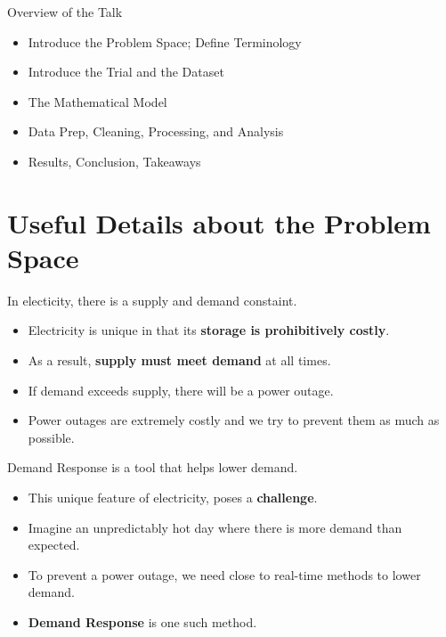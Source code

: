 \documentclass{beamer}
\begin{document}
\begin{frame}{Overview of the Talk}
  \begin{itemize}
  \item<+-> Introduce the Problem Space; Define Terminology
  \item<+-> Introduce the Trial and the Dataset
  \item<+-> The Mathematical Model
  \item<+-> Data Prep, Cleaning, Processing, and Analysis
  \item<+-> Results, Conclusion, Takeaways
  \end{itemize}
\end{frame}

\section{Useful Details about the Problem Space}

\begin{frame}{In electicity, there is a supply and demand constaint.}
  \begin{itemize}
    \item<+-> Electricity is unique in that its \textbf{storage is prohibitively costly}.
    \item<+-> As a result, \textbf{supply must meet demand} at all times. 
    \item<+-> If demand exceeds supply, there will be a power outage. 
    \item<+-> Power outages are extremely costly and we try to prevent them as much as possible.
  \end{itemize}
\end{frame}

\begin{frame}{Demand Response is a tool that helps lower demand.}
  \begin{itemize}
    \item<+-> This unique feature of electricity, poses a \textbf{challenge}. 
    \item<+-> Imagine an unpredictably hot day where there is more demand than expected.
    \item<+-> To prevent a power outage, we need close to real-time methods to lower demand.
    \item<+-> \textbf{Demand Response} is one such method.
  \end{itemize}
\end{frame}
\end{document}
